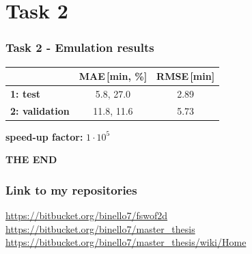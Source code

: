 \documentclass[xcolor=dvipsnames, USenglish]{beamer}  %
\begin{document}
\section{Task 2}
  \begin{frame}
    \frametitle{Task 2 - Emulation results}
    \begin{table}
    \centering
       \begin{tabular}{lcc}
       \toprule
        & \textbf{MAE\,[min, \%]} & \textbf{RMSE\,[min]}\\
       \midrule
       \textbf{1: test} & 5.8, 27.0 & 2.89\\
       \textbf{2: validation} & 11.8, 11.6 & 5.73\\
       \bottomrule
       \end{tabular}
    \end{table}
    \centering
    \large{\textbf{speed-up factor:} \boldmath$1 \cdot 10^5$}
  \end{frame}

  {
  \begin{frame}[plain]
    \centering
    \Large{\textbf{THE END}}\\
  \end{frame}
  }

  \begin{frame}
    \frametitle{Link to my repositories}
    \small{\url{https://bitbucket.org/binello7/fswof2d}}\\
    \small{\url{https://bitbucket.org/binello7/master_thesis}}\\
    \small{\url{https://bitbucket.org/binello7/master_thesis/wiki/Home}}
  \end{frame}
\end{document}
